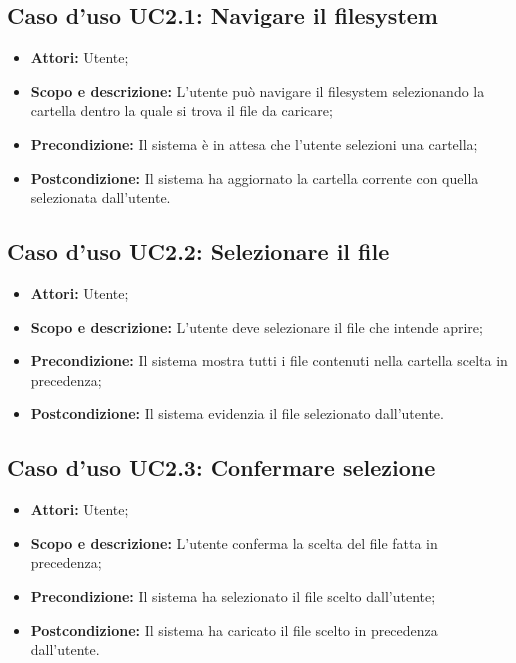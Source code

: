 \subsection{Caso d'uso UC2.1: Navigare il filesystem}
\begin{itemize}
	\item \textbf{Attori:} Utente;
	\item \textbf{Scopo e descrizione:} L'utente può navigare il filesystem selezionando la cartella dentro la quale si trova il file da caricare;
	\item \textbf{Precondizione:} Il sistema è in attesa che l'utente selezioni una cartella;
	\item \textbf{Postcondizione:} Il sistema ha aggiornato la cartella corrente con quella selezionata dall'utente.
\end{itemize}

\subsection{Caso d'uso UC2.2: Selezionare il file}
\begin{itemize}
	\item \textbf{Attori:} Utente;
	\item \textbf{Scopo e descrizione:} L'utente deve selezionare il file che intende aprire;
	\item \textbf{Precondizione:} Il sistema mostra tutti i file contenuti nella cartella scelta in precedenza;
	\item \textbf{Postcondizione:} Il sistema evidenzia il file selezionato dall'utente.
\end{itemize}

\subsection{Caso d'uso UC2.3: Confermare selezione}
\begin{itemize}
	\item \textbf{Attori:} Utente;
	\item \textbf{Scopo e descrizione:} L'utente conferma la scelta del file fatta in precedenza;
	\item \textbf{Precondizione:} Il sistema ha selezionato il file scelto dall'utente;
	\item \textbf{Postcondizione:} Il sistema ha caricato il file scelto in precedenza dall'utente.
\end{itemize}